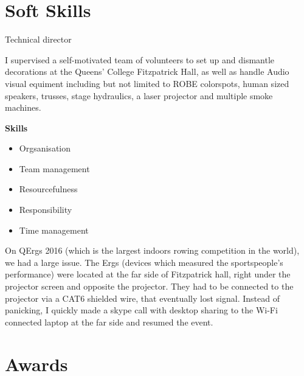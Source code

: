 \documentclass{CurriculumVitae}[10pt, condensed]
\begin{document}
\section*{Soft Skills}

 {Technical director} {I supervised a
  self-motivated team of volunteers to set up and dismantle
  decorations at the Queens' College Fitzpatrick Hall, as well as
  handle Audio visual equiment including but not limited to ROBE
  colorspots, human sized speakers, trusses, stage hydraulics, a laser
  projector and multiple smoke machines. 

\textbf{Skills}
\begin{itemize}
\item Orgsanisation
\item Team management
\item Resourcefulness
\item Responsibility
\item Time management
\end{itemize}

On QErgs 2016 (which is the largest indoors rowing competition in the
world), we had a large issue. The Ergs (devices which measured the
sportspeople's performance) were located at the far side of
Fitzpatrick hall, right under the projector screen and opposite the
projector. They had to be connected to the projector via a CAT6
shielded wire, that eventually lost signal. Instead of panicking, I
quickly made a skype call with desktop sharing to the Wi-Fi connected
laptop at the far side and resumed the event. }
\section*{Awards}







\end{document}

